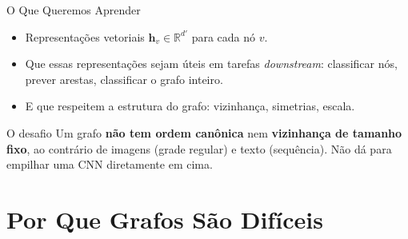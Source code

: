 \documentclass[aspectratio=169,xcolor=dvipsnames]{beamer}
\begin{document}
  \begin{frame}{O Que Queremos Aprender}
    \begin{itemize}
      \item Representações vetoriais $\mathbf{h}_v \in \mathbb{R}^{d'}$ para cada nó $v$.
      \item Que essas representações sejam úteis em tarefas \textit{downstream}:
            classificar nós, prever arestas, classificar o grafo inteiro.
      \item E que respeitem a estrutura do grafo: vizinhança, simetrias, escala.
    \end{itemize}

    \vspace{0.5em}
    \begin{alertblock}{O desafio}
      Um grafo \textbf{não tem ordem canônica} nem \textbf{vizinhança de tamanho fixo},
      ao contrário de imagens (grade regular) e texto (sequência).
      Não dá para empilhar uma CNN diretamente em cima.
    \end{alertblock}
  \end{frame}

  \section{Por Que Grafos São Difíceis}
\end{document}

